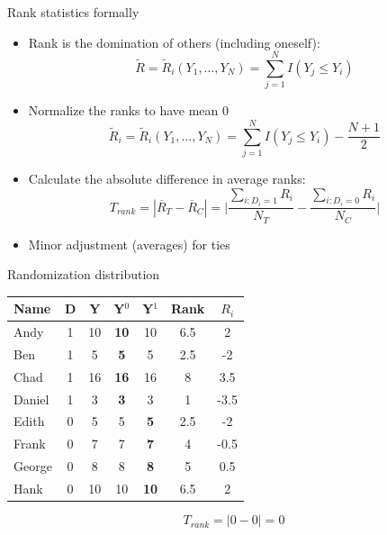 \documentclass{beamer}
\begin{document}
\begin{frame}{Rank statistics formally}

\begin{itemize}
\item Rank is the domination of others (including oneself): $$\tilde{R} = \tilde{R}_i(Y_1, \dots , Y_N) = \sum_{j=1}^N I(Y_j \leq Y_i)$$
\item Normalize the ranks to have mean 0 $$\tilde{R}_i = \tilde{R}_i(Y_1, \dots, Y_N) = \sum_{j=1}^N I(Y_j \leq Y_i) - \frac{N+1}{2}$$
\item Calculate the absolute difference in average ranks: $$T_{rank} = |\overline{R}_T - \overline{R}_C | = \bigg | \frac{\sum_{i:D_i=1} R_i}{N_T} - \frac{\sum_{i:D_i=0} R_i}{N_C} \bigg |$$
\item Minor adjustment (averages) for ties
\end{itemize}

\end{frame}

\begin{frame}{Randomization distribution}

\begin{table}[htbp]\centering
\begin{center}
\begin{threeparttable}
\begin{tabular}{l|cc|cc|cc}
\toprule
\multicolumn{1}{l}{Name}&
\multicolumn{1}{c}{D}&
\multicolumn{1}{c}{Y}&
\multicolumn{1}{c}{Y$^0$}&
\multicolumn{1}{c}{Y$^1$}&
\multicolumn{1}{c}{Rank}&
\multicolumn{1}{c}{$R_i$}\\
\midrule
Andy		& 1 & 10  & \textbf{10} & 10 & 6.5 & 2\\
Ben		& 1 & 5    & \textbf{5} & 5 & 2.5 & -2\\
Chad	& 1 & 16  & \textbf{16} & 16 & 8  &3.5 \\
Daniel	& 1 &  3   & \textbf{3} & 3 & 1 & -3.5\\
Edith		& 0 & 5    & 5 & \textbf{5} & 2.5 & -2\\
Frank	& 0 & 7    & 7& \textbf{7} & 4 & -0.5 \\
George	& 0 & 8    & 8 & \textbf{8} & 5 & 0.5\\
Hank		& 0 & 10  & 10 & \textbf{10} & 6.5 & 2\\
\bottomrule
\end{tabular}
\end{threeparttable}
\end{center}
\end{table}


$$T_{rank} = | 0 - 0 | = 0$$

\end{frame}
\end{document}
